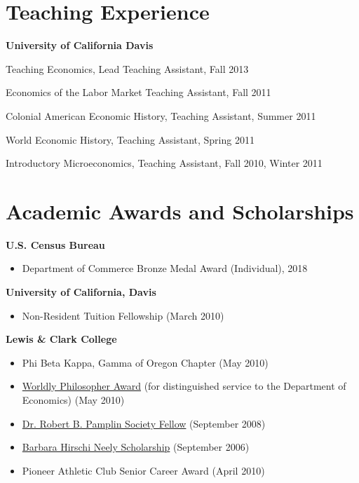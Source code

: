 \documentclass[margin,line]{res}
\newenvironment{list1}{
  \begin{list}{\ding{113}}{%
      \setlength{\itemsep}{0in}
      \setlength{\parsep}{0in} \setlength{\parskip}{0in}
      \setlength{\topsep}{0in} \setlength{\partopsep}{0in} 
      \setlength{\leftmargin}{0.17in}}}{\end{list}}
\begin{document}
\begin{resume}
\section{\sc Teaching Experience}
\textbf{University of California Davis}
\begin{list1}
 \setlength{\itemsep}{0cm}%
  \setlength{\parskip}{0cm}%
	\item[] Teaching Economics, Lead Teaching Assistant, Fall 2013
	\item[] Economics of the Labor Market Teaching Assistant, Fall 2011
	\item[] Colonial American Economic History, Teaching Assistant, Summer 2011
	\item[] World Economic History, Teaching Assistant, Spring 2011 
	\item[] Introductory Microeconomics, Teaching Assistant, Fall 2010, Winter 2011
\end{list1}




\section{\sc Academic Awards and Scholarships} 
\textbf{U.S. Census Bureau} 
\begin{itemize}
	 \setlength{\itemsep}{0cm}%
  \setlength{\parskip}{0cm}%
	\item Department of Commerce Bronze Medal Award (Individual), 2018
\end{itemize}

\textbf{University of California, Davis}
\begin{itemize}
	 \setlength{\itemsep}{0cm}%
  \setlength{\parskip}{0cm}%
	\item Non-Resident Tuition Fellowship (March 2010)
\end{itemize}
\vspace*{-.1in}
\textbf{Lewis \& Clark College}
\begin{itemize}
	 \setlength{\itemsep}{0cm}%
  	\setlength{\parskip}{0cm}%
	\item Phi Beta Kappa, Gamma of Oregon Chapter (May 2010)
	\item \href{http://college.lclark.edu/departments/economics/news/}{Worldly Philosopher Award} (for distinguished service to the Department of Economics) (May 2010)
	\item \href{http://college.lclark.edu/academics/honors/pamplin_society/}{Dr. Robert B. Pamplin Society Fellow} (September 2008)
	\item \href{http://www.lclark.edu/offices/financial_aid/merit_scholarships/}{Barbara Hirschi Neely Scholarship} (September 2006)
	\item Pioneer Athletic Club Senior Career Award (April 2010)
\end{itemize}



\end{resume}
\end{document}
